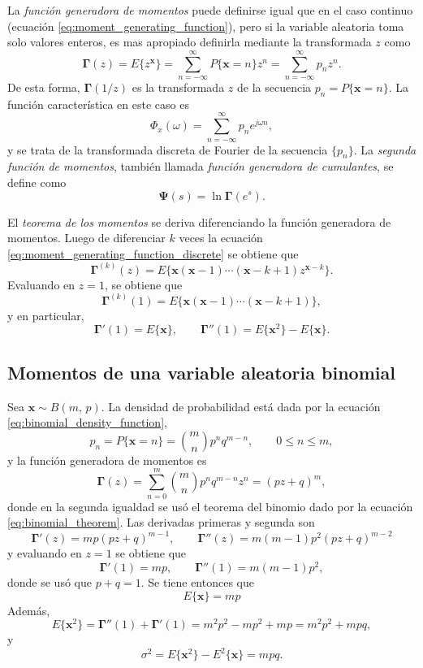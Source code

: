 \documentclass[a4paper]{report}
\newcommand{\x}{\mathbf{x}}
\newcommand{\Psibf}{\mathbf{\Psi}}
\newcommand{\Gammabf}{\mathbf{\Gamma}}
\begin{document}
La \emph{función generadora de momentos} puede definirse igual que en el caso continuo (ecuación \ref{eq:moment_generating_function}), pero si la variable aleatoria toma solo valores enteros, es mas apropiado definirla mediante la transformada \(z\) como
\begin{equation}\label{eq:moment_generating_function_discrete}
 \Gammabf(z)=E\{z^\x\}=\sum_{n=-\infty}^{\infty}P\{\x=n\}z^{n}=\sum_{n=-\infty}^{\infty}p_nz^{n}.
\end{equation}
De esta forma, \(\Gammabf(1/z)\) es la transformada \(z\) de la secuencia \(p_n=P\{\x=n\}\). La función característica en este caso es
\[
 \Phi_x(\omega)=\sum _{n=-\infty}^{\infty}p_ne^{j\omega n},
\]
y se trata de la transformada discreta de Fourier de la secuencia \(\{p_n\}\). La \emph{segunda función de momentos}, también llamada \emph{función generadora de cumulantes}, se define como
\begin{equation}\label{eq:second_moment_function_discrete}
 \Psibf(s)=\ln\Gammabf(e^s).
\end{equation}

El \emph{teorema de los momentos} se deriva diferenciando la función generadora de momentos. Luego de diferenciar \(k\) veces la ecuación \ref{eq:moment_generating_function_discrete} se obtiene que
\[
 \Gammabf^{(k)}(z)=E\{\x(\x-1)\cdots(\x-k+1)z^{\x-k}\}.
\]
Evaluando en \(z=1\), se obtiene que
\[
 \Gammabf^{(k)}(1)=E\{\x(\x-1)\cdots(\x-k+1)\},
\]
y en particular, 
\[
 \Gammabf'(1)=E\{\x\},\qquad\Gammabf''(1)=E\{\x^2\}-E\{\x\}.
\]

\subsection{Momentos de una variable aleatoria binomial}

Sea \(\x\sim B(m,\,p)\). La densidad de probabilidad está dada por la ecuación \ref{eq:binomial_density_function},
\[
 p_n=P\{\x=n\}=\binom{m}{n}p^nq^{m-n},\qquad0\leq n\leq m,
\]
y la función generadora de momentos es
\begin{equation}\label{eq:binomial_moment_generating_function}
  \Gammabf(z)=\sum_{n=0}^{m}\binom{m}{n}p^nq^{m-n}z^{n}=(pz+q)^m,
\end{equation}
donde en la segunda igualdad se usó el teorema del binomio dado por la ecuación \ref{eq:binomial_theorem}. Las derivadas primeras y segunda son
\[
 \Gammabf'(z)=mp(pz+q)^{m-1},\qquad \Gammabf''(z)=m(m-1)p^2(pz+q)^{m-2}
\]
y evaluando en \(z=1\) se obtiene que
\[
 \Gammabf'(1)=mp,\qquad \Gammabf''(1)=m(m-1)p^2,
\]
donde se usó que \(p+q=1\). Se tiene entonces que
\[
 E\{\x\}=mp
\]
Además,
\[
 E\{\x^2\}=\Gammabf''(1)+\Gammabf'(1)=m^2p^2-mp^2+mp=m^2p^2+mpq,
\]
y
\[
 \sigma^2=E\{\x^2\}-E^2\{\x\}=mpq.
\]
\end{document}
